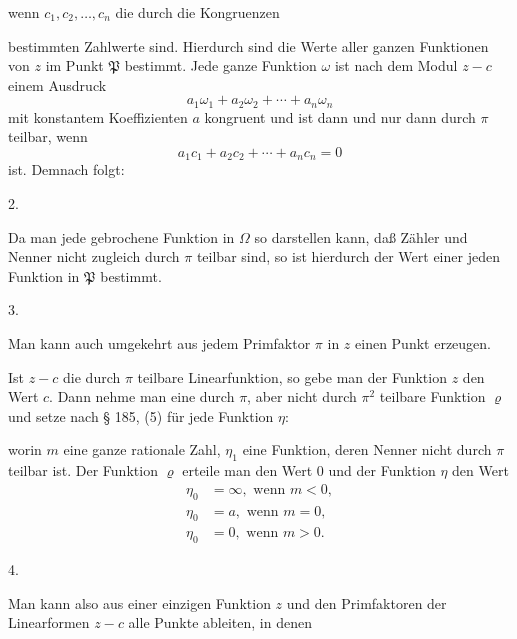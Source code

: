 wenn $c_1, c_2, \ldots, c_n$ die durch die Kongruenzen


bestimmten Zahlwerte sind. Hierdurch sind die Werte aller ganzen Funktionen von $z$ im Punkt $\mathfrak{P}$ bestimmt. Jede ganze Funktion $\omega$ ist nach dem Modul $z - c$ einem Ausdruck
\[
a_1\omega_1 + a_2\omega_2 + \cdots + a_n\omega_n
\]
mit konstantem Koeffizienten $a$ kongruent und ist dann und nur dann durch $\pi$ teilbar, wenn
\[
a_1c_1 + a_2c_2 + \cdots + a_nc_n = 0
\]
ist. Demnach folgt:

2. 

Da man jede gebrochene Funktion in $\Omega$ so darstellen kann, daß Zähler und Nenner nicht zugleich durch $\pi$ teilbar sind, so ist hierdurch der Wert einer jeden Funktion in $\mathfrak{P}$ bestimmt.

3. 

Man kann auch umgekehrt aus jedem Primfaktor $\pi$ in $z$ einen Punkt erzeugen.

Ist $z - c$ die durch $\pi$ teilbare Linearfunktion, so gebe man der Funktion $z$ den Wert $c$. Dann nehme man eine durch $\pi$, aber nicht durch $\pi^2$ teilbare Funktion $\varrho$ und setze nach § 185, (5) für jede Funktion $\eta$:


worin $m$ eine ganze rationale Zahl, $\eta_1$ eine Funktion, deren Nenner nicht durch $\pi$ teilbar ist. Der Funktion $\varrho$ erteile man den Wert 0 und der Funktion $\eta$ den Wert
\[
\begin{aligned}
\eta_0 &= \infty, \text{ wenn } m < 0,\\
\eta_0 &= a, \text{ wenn } m = 0,\\
\eta_0 &= 0, \text{ wenn } m > 0.
\end{aligned}
\]

4. 

Man kann also aus einer einzigen Funktion $z$ und den Primfaktoren der Linearformen $z - c$ alle Punkte ableiten, in denen
